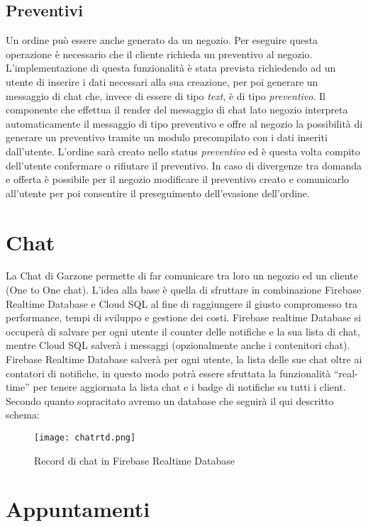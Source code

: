 \subsection{Preventivi}
Un ordine può essere anche generato da un negozio. Per eseguire questa operazione è necessario che il cliente richieda un preventivo al negozio. L'implementazione di questa funzionalità è stata prevista richiedendo ad un utente di inserire i dati necessari alla sua creazione, per poi generare un messaggio di chat che, invece di essere di tipo \textit{text}, è di tipo \textit{preventivo}. Il componente che effettua il render del messaggio di chat lato negozio interpreta automaticamente il messaggio di tipo preventivo e offre al negozio la possibilità di generare un preventivo tramite un modulo precompilato con i dati inseriti dall'utente. L'ordine sarà creato nello status \textit{preventivo} ed è questa volta compito dell'utente confermare o rifiutare il preventivo. In caso di divergenze tra domanda e offerta è possibile per il negozio modificare il preventivo creato e comunicarlo all'utente per poi consentire il preseguimento dell'evasione dell'ordine.
\section{Chat}
La Chat di Garzone permette di far comunicare tra loro un negozio ed un  cliente (One to One chat). L’idea alla base è quella di sfruttare in combinazione Firebase Realtime Database e Cloud SQL al fine di raggiungere il giusto compromesso tra performance, tempi di sviluppo e gestione dei costi. Firebase realtime Database si occuperà di salvare per ogni utente il counter delle notifiche e la sua lista di chat, mentre Cloud SQL salverà i messaggi (opzionalmente anche i contenitori chat). Firebase Realtime Database salverà per ogni utente, la lista delle sue chat oltre ai contatori di notifiche, in questo modo potrà essere sfruttata la funzionalità “real-time” per tenere aggiornata la lista chat e i badge di notifiche su tutti i client.\\
Secondo quanto sopracitato avremo un database che seguirà il qui descritto schema:
\begin{figure}[h!]
    \centering
    \texttt{[image: chatrtd.png]}
    \caption{Record di chat in Firebase Realtime Database}
\end{figure}
\FloatBarrier

\section{Appuntamenti}